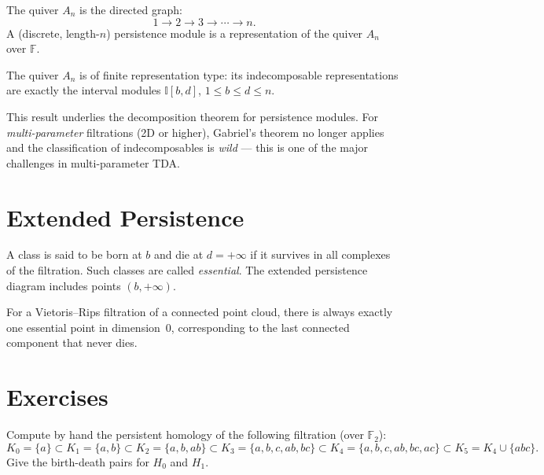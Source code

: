 \begin{definition}[Quiver $A_n$]
The quiver $A_n$ is the directed graph:
\[
  1 \to 2 \to 3 \to \cdots \to n.
\]
A (discrete, length-$n$) persistence module is a representation of the
quiver $A_n$ over $\mathbb{F}$.
\end{definition}

\begin{theorem}[Gabriel, 1972]
The quiver $A_n$ is of finite representation type: its indecomposable
representations are exactly the interval modules $\mathbb{I}[b, d]$,
$1 \leq b \leq d \leq n$.
\end{theorem}

\begin{remark}
This result underlies the decomposition theorem for persistence modules.
For \emph{multi-parameter} filtrations (2D or higher), Gabriel's theorem
no longer applies and the classification of indecomposables is
\emph{wild} --- this is one of the major challenges in multi-parameter
TDA.
\end{remark}

\section{Extended Persistence}

\begin{definition}
A class is said to be born at $b$ and die at $d = +\infty$ if it
survives in all complexes of the filtration. Such classes are called
\emph{essential}. The extended persistence diagram includes points
$(b, +\infty)$.
\end{definition}

\begin{proposition}
For a Vietoris--Rips filtration of a connected point cloud, there is
always exactly one essential point in dimension~$0$, corresponding to
the last connected component that never dies.
\end{proposition}

\section{Exercises}

\begin{exercise}
Compute by hand the persistent homology of the following filtration
(over $\mathbb{F}_2$):
\[
  K_0 = \{a\} \subset K_1 = \{a, b\} \subset K_2 = \{a, b, ab\}
  \subset K_3 = \{a, b, c, ab, bc\}
  \subset K_4 = \{a, b, c, ab, bc, ac\}
  \subset K_5 = K_4 \cup \{abc\}.
\]
Give the birth-death pairs for $H_0$ and $H_1$.
\end{exercise}

